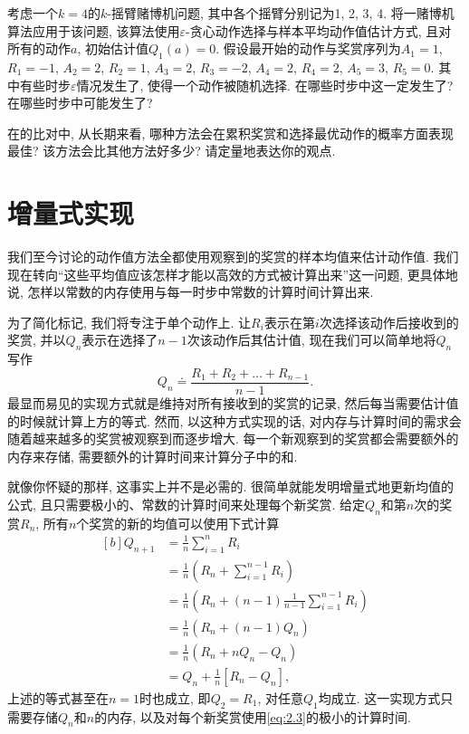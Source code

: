 \begin{exer}[赌博机例子]
考虑一个$k = 4$的$k$-摇臂赌博机问题, 其中各个摇臂分别记为1, 2, 3, 4. 将一赌博机算法应用于该问题, 该算法使用$\varepsilon$-贪心动作选择与样本平均动作值估计方式, 且对所有的动作$a$, 初始估计值$Q_1(a) = 0$. 假设最开始的动作与奖赏序列为$A_1 = 1$, $R_1 = -1$, $A_2 = 2$, $R_2 = 1$, $A_3 = 2$, $R_3 = -2$, $A_4 = 2$, $R_4 = 2$, $A_5 = 3$, $R_5 = 0$. 其中有些时步$\varepsilon$情况发生了, 使得一个动作被随机选择. 在哪些时步中这一定发生了? 在哪些时步中可能发生了?
\end{exer}

\begin{exer}
在的比对中, 从长期来看, 哪种方法会在累积奖赏和选择最优动作的概率方面表现最佳? 该方法会比其他方法好多少? 请定量地表达你的观点.
\end{exer}

\section{增量式实现}\label{sec:2.4}

我们至今讨论的动作值方法全都使用观察到的奖赏的样本均值来估计动作值. 我们现在转向``这些平均值应该怎样才能以高效的方式被计算出来''这一问题, 更具体地说, 怎样以常数的内存使用与每一时步中常数的计算时间计算出来. 

为了简化标记, 我们将专注于单个动作上. 让$R_i$表示在第$i$次选择该动作后接收到的奖赏, 并以$Q_n$表示在选择了$n - 1$次该动作后其估计值, 现在我们可以简单地将$Q_n$写作
\begin{equation*}
Q_n \doteq \frac{R_1 + R_2 + \dots + R_{n - 1}}{n - 1}.
\end{equation*}
最显而易见的实现方式就是维持对所有接收到的奖赏的记录, 然后每当需要估计值的时候就计算上方的等式. 然而, 以这种方式实现的话, 对内存与计算时间的需求会随着越来越多的奖赏被观察到而逐步增大. 每一个新观察到的奖赏都会需要额外的内存来存储, 需要额外的计算时间来计算分子中的和.

就像你怀疑的那样, 这事实上并不是必需的. 很简单就能发明增量式地更新均值的公式, 且只需要极小的、常数的计算时间来处理每个新奖赏. 给定$Q_n$和第$n$次的奖赏$R_n$, 所有$n$个奖赏的新的均值可以使用下式计算
\begin{equation}\label{eq:2.3}
\begin{aligned}[b]
Q_{n + 1} &= \frac{1}{n} \sum_{i = 1}^n R_i \\
&= \frac{1}{n} \left( R_n + \sum_{i = 1}^{n - 1}R_i \right) \\
&= \frac{1}{n} \left( R_n + (n - 1) \frac{1}{n - 1} \sum_{i = 1}^{n - 1}R_i \right) \\
&= \frac{1}{n} \left( R_n + (n - 1) Q_n \right) \\
&= \frac{1}{n} \left( R_n +n Q_n - Q_n \right) \\
&= Q_n + \frac{1}{n} \left[ R_n - Q_n \right],
\end{aligned}
\end{equation}
上述的等式甚至在$n = 1$时也成立, 即$Q_2 = R_1$, 对任意$Q_1$均成立. 这一实现方式只需要存储$Q_n$和$n$的内存, 以及对每个新奖赏使用\eqref{eq:2.3}的极小的计算时间.

